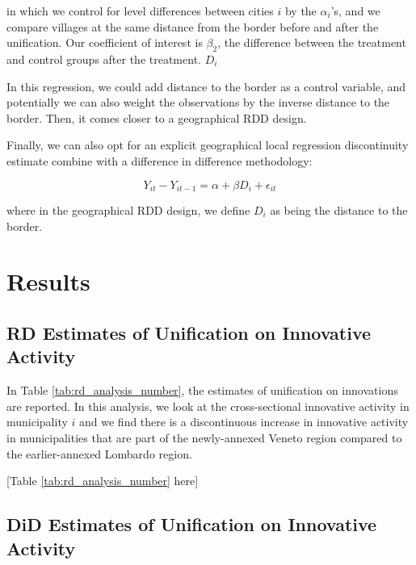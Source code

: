 in which we control for level differences between cities $i$ by the $\alpha_i$'s, and we compare villages at the same distance from the border before and after the unification. Our coefficient of interest is $\beta_2$, the difference between the treatment and control groups after the treatment. $D_i$ 

In this regression, we could add distance to the border as a control variable, and potentially we can also weight the observations by the inverse distance to the border. Then, it comes closer to a geographical RDD design. 

Finally, we can also opt for an explicit geographical local regression discontinuity estimate combine with a difference in difference methodology: 

\begin{equation*}
    Y_{it} - Y_{it-1} = \alpha + \beta D_i + \epsilon_{it}
\end{equation*}

where in the geographical RDD design, we define $D_i$ as being the distance to the border. 




\section{Results}


\subsection{RD Estimates of Unification on Innovative Activity}

In Table \ref{tab:rd_analysis_number}, the estimates of unification on innovations are reported. In this analysis, we look at the cross-sectional innovative activity in municipality $i$ and we find there is a discontinuous increase in innovative activity in municipalities that are part of the newly-annexed Veneto region compared to the earlier-annexed Lombardo region. 

\begin{center}
    [Table \ref{tab:rd_analysis_number} here]
\end{center}

\subsection{DiD Estimates of Unification on Innovative Activity}

